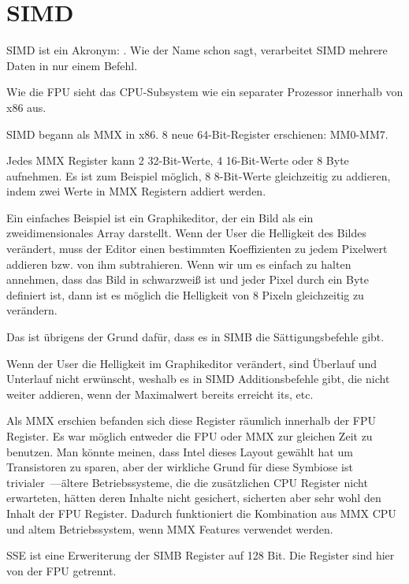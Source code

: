\section{SIMD}

\label{SIMD_x86}
\ac{SIMD} ist ein Akronym: .
Wie der Name schon sagt, verarbeitet SIMD mehrere Daten in nur einem Befehl.

Wie die \ac{FPU} sieht das \ac{CPU}-Subsystem wie ein separater Prozessor innerhalb von x86 aus.


SIMD begann als MMX in x86. 8 neue 64-Bit-Register erschienen: MM0-MM7.

Jedes MMX Register kann 2 32-Bit-Werte, 4 16-Bit-Werte oder 8 Byte aufnehmen.
Es ist zum Beispiel möglich, 8 8-Bit-Werte gleichzeitig zu addieren, indem zwei Werte in MMX Registern addiert werden.

Ein einfaches Beispiel ist ein Graphikeditor, der ein Bild als ein zweidimensionales Array darstellt.
Wenn der User die Helligkeit des Bildes verändert, muss der Editor einen bestimmten Koeffizienten zu jedem Pixelwert
addieren bzw. von ihm subtrahieren.
Wenn wir um es einfach zu halten annehmen, dass das Bild in schwarzweiß ist und jeder Pixel durch ein Byte definiert
ist, dann ist es möglich die Helligkeit von 8 Pixeln gleichzeitig zu verändern.

Das ist übrigens der Grund dafür, dass es in SIMB die Sättigungsbefehle gibt.

Wenn der User die Helligkeit im Graphikeditor verändert, sind Überlauf und Unterlauf nicht erwünscht, weshalb es in SIMD
Additionsbefehle gibt, die nicht weiter addieren, wenn der Maximalwert bereits erreicht its, etc.

Als MMX erschien befanden sich diese Register räumlich innerhalb der FPU Register.
Es war möglich entweder die FPU oder MMX zur gleichen Zeit zu benutzen. Man könnte meinen, dass Intel dieses Layout
gewählt hat um Transistoren zu sparen, aber der wirkliche Grund für diese Symbiose ist trivialer~---ältere
Betriebssysteme, die die zusätzlichen CPU Register nicht erwarteten, hätten deren Inhalte nicht gesichert, sicherten
aber sehr wohl den Inhalt der FPU Register.
Dadurch funktioniert die Kombination aus MMX CPU und altem Betriebssystem, wenn MMX Features verwendet werden. 

SSE ist eine Erweriterung der SIMB Register auf 128 Bit. Die Register sind hier von der FPU getrennt.

